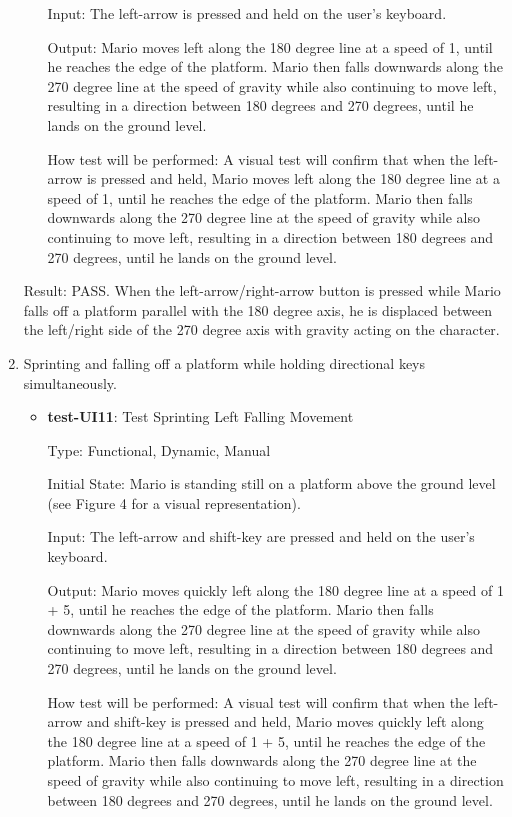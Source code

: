 \documentclass[12pt, titlepage]{article}
\begin{document}
\begin{enumerate}
\begin{itemize}
Input: The left-arrow is pressed and held on the user's keyboard.
					
Output: Mario moves left along the 180 degree line at a speed of 1, until he reaches the edge of the platform. Mario then falls downwards along the 270 degree line at the speed of gravity while also continuing to move left, resulting in a direction between 180 degrees and 270 degrees, until he lands on the ground level.
					
How test will be performed: A visual test will confirm that when the left-arrow is pressed and held, Mario moves left along the 180 degree line at a speed of 1, until he reaches the edge of the platform. Mario then falls downwards along the 270 degree line at the speed of gravity while also continuing to move left, resulting in a direction between 180 degrees and 270 degrees, until he lands on the ground level.

\end{itemize}

Result: PASS.  When the left-arrow/right-arrow button is pressed while Mario falls off a platform parallel with the 180 degree axis, he is displaced between the left/right side of the 270 degree axis with gravity acting on the character.

\item Sprinting and falling off a platform while holding directional keys simultaneously.

\begin{itemize}
\item{\textbf{test-UI11}: Test Sprinting Left Falling Movement\\}

Type: Functional, Dynamic, Manual
					
Initial State: Mario is standing still on a platform above the ground level (see Figure 4 for a visual representation).
					
Input: The left-arrow and  shift-key are pressed and held on the user's keyboard.
					
Output: Mario moves quickly left along the 180 degree line at a speed of 1 + 5, until he reaches the edge of the platform. Mario then falls downwards along the 270 degree line at the speed of gravity while also continuing to move left, resulting in a direction between 180 degrees and 270 degrees, until he lands on the ground level.
					
How test will be performed: A visual test will confirm that when the left-arrow and shift-key is pressed and held, Mario moves quickly left along the 180 degree line at a speed of 1 + 5, until he reaches the edge of the platform. Mario then falls downwards along the 270 degree line at the speed of gravity while also continuing to move left, resulting in a direction between 180 degrees and 270 degrees, until he lands on the ground level.


\end{itemize}
\end{enumerate}
\end{document}

